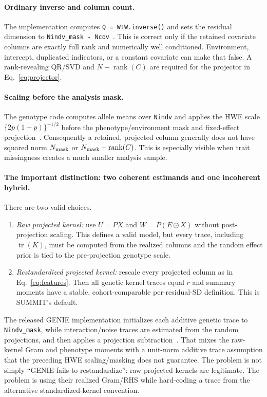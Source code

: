 \documentclass[11pt]{article}
\newcommand{\tr}{\operatorname{tr}}
\begin{document}
\paragraph{Ordinary inverse and column count.}
The implementation computes \texttt{Q = WtW.inverse()} and sets the residual
dimension to \texttt{Nindv\_mask - Ncov}~\cite{geniecodecov}.  This is correct
only if the retained covariate columns are exactly full rank and numerically
well conditioned.  Environment, intercept, duplicated indicators, or a
constant covariate can make that false.  A rank-revealing QR/SVD and
$N-\operatorname{rank}(C)$ are required for the projector in
Eq.~\eqref{eq:projector}.

\paragraph{Scaling before the analysis mask.}
The genotype code computes allele means over \texttt{Nindv} and applies the
HWE scale $\{2p(1-p)\}^{-1/2}$ before the phenotype/environment mask and
fixed-effect projection~\cite{geniecodescale}.  Consequently a retained,
projected column generally does not have squared norm $N_{\rm mask}$ or
$N_{\rm mask}-\operatorname{rank}(C)$.  This is especially visible when trait
missingness creates a much smaller analysis sample.

\paragraph{The important distinction: two coherent estimands and one
incoherent hybrid.}
There are two valid choices.
\begin{enumerate}
 \item \emph{Raw projected kernel:} use $U=PX$ and $W=P(E\odot X)$ without
 post-projection scaling.  This defines a valid model, but every trace,
 including $\tr(K)$, must be computed from the realized columns and the random
 effect prior is tied to the pre-projection genotype scale.
 \item \emph{Restandardized projected kernel:} rescale every projected column
 as in Eq.~\eqref{eq:features}.  Then all genetic kernel traces equal $r$ and
 summary moments have a stable, cohort-comparable per-residual-SD definition.
 This is SUMMIT's default.
\end{enumerate}
The released GENIE implementation initializes each additive genetic trace to
\texttt{Nindv\_mask}, while interaction/noise traces are estimated from the
random projections, and then applies a projection subtraction~\cite{geniecodetrace}.
That mixes the raw-kernel Gram and phenotype moments with a unit-norm additive
trace assumption that the preceding HWE scaling/masking does not guarantee.
The problem is not simply ``GENIE fails to restandardize'': raw projected
kernels are legitimate.  The problem is using their realized Gram/RHS while
hard-coding a trace from the alternative standardized-kernel convention.
\end{document}
